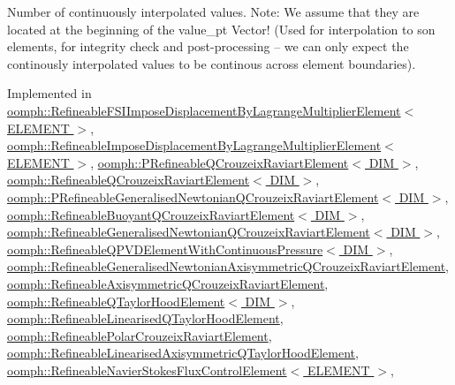 Number of continuously interpolated values. Note\+: We assume that they are located at the beginning of the value\+\_\+pt Vector! (Used for interpolation to son elements, for integrity check and post-\/processing -- we can only expect the continously interpolated values to be continous across element boundaries). 



Implemented in \hyperlink{classoomph_1_1RefineableFSIImposeDisplacementByLagrangeMultiplierElement_af0e6193a9a1744d19efd4dfb48234bb0}{oomph\+::\+Refineable\+F\+S\+I\+Impose\+Displacement\+By\+Lagrange\+Multiplier\+Element$<$ E\+L\+E\+M\+E\+N\+T $>$}, \hyperlink{classoomph_1_1RefineableImposeDisplacementByLagrangeMultiplierElement_ab6d8d2ed5da8e699c290e085625d2f45}{oomph\+::\+Refineable\+Impose\+Displacement\+By\+Lagrange\+Multiplier\+Element$<$ E\+L\+E\+M\+E\+N\+T $>$}, \hyperlink{classoomph_1_1PRefineableQCrouzeixRaviartElement_a8fc2388f81c74e6c9dc32058592ed7d2}{oomph\+::\+P\+Refineable\+Q\+Crouzeix\+Raviart\+Element$<$ D\+I\+M $>$}, \hyperlink{classoomph_1_1RefineableQCrouzeixRaviartElement_a3f6b1ffd6ae7beef75c2347df90ec701}{oomph\+::\+Refineable\+Q\+Crouzeix\+Raviart\+Element$<$ D\+I\+M $>$}, \hyperlink{classoomph_1_1PRefineableGeneralisedNewtonianQCrouzeixRaviartElement_ad06beb84a9e912db67814f0eb8add2fb}{oomph\+::\+P\+Refineable\+Generalised\+Newtonian\+Q\+Crouzeix\+Raviart\+Element$<$ D\+I\+M $>$}, \hyperlink{classoomph_1_1RefineableBuoyantQCrouzeixRaviartElement_a98f094a1c3080905d0e90f5ac6ebd1b6}{oomph\+::\+Refineable\+Buoyant\+Q\+Crouzeix\+Raviart\+Element$<$ D\+I\+M $>$}, \hyperlink{classoomph_1_1RefineableGeneralisedNewtonianQCrouzeixRaviartElement_aae8a005fdf9c488de07313101792164b}{oomph\+::\+Refineable\+Generalised\+Newtonian\+Q\+Crouzeix\+Raviart\+Element$<$ D\+I\+M $>$}, \hyperlink{classoomph_1_1RefineableQPVDElementWithContinuousPressure_ace99412d0a2d0015ce56c3ee4c375254}{oomph\+::\+Refineable\+Q\+P\+V\+D\+Element\+With\+Continuous\+Pressure$<$ D\+I\+M $>$}, \hyperlink{classoomph_1_1RefineableGeneralisedNewtonianAxisymmetricQCrouzeixRaviartElement_a774dcb42390e7e3cf14a33c41cd957c3}{oomph\+::\+Refineable\+Generalised\+Newtonian\+Axisymmetric\+Q\+Crouzeix\+Raviart\+Element}, \hyperlink{classoomph_1_1RefineableAxisymmetricQCrouzeixRaviartElement_a8ec04aa9fe1b416afd6fadcbc571d47e}{oomph\+::\+Refineable\+Axisymmetric\+Q\+Crouzeix\+Raviart\+Element}, \hyperlink{classoomph_1_1RefineableQTaylorHoodElement_ab47675822b8632474fc4e3e435fc19bf}{oomph\+::\+Refineable\+Q\+Taylor\+Hood\+Element$<$ D\+I\+M $>$}, \hyperlink{classoomph_1_1RefineableLinearisedQTaylorHoodElement_a16a99dc576178ec2c1b9f93df45d326a}{oomph\+::\+Refineable\+Linearised\+Q\+Taylor\+Hood\+Element}, \hyperlink{classoomph_1_1RefineablePolarCrouzeixRaviartElement_a7541eaf63cc4f45427acaa169d165f66}{oomph\+::\+Refineable\+Polar\+Crouzeix\+Raviart\+Element}, \hyperlink{classoomph_1_1RefineableLinearisedAxisymmetricQTaylorHoodElement_add4cd6369630d663d1fce603040ebe72}{oomph\+::\+Refineable\+Linearised\+Axisymmetric\+Q\+Taylor\+Hood\+Element}, \hyperlink{classoomph_1_1RefineableNavierStokesFluxControlElement_a047277ea9c38d3d411b3734c59b64435}{oomph\+::\+Refineable\+Navier\+Stokes\+Flux\+Control\+Element$<$ E\+L\+E\+M\+E\+N\+T $>$}, 